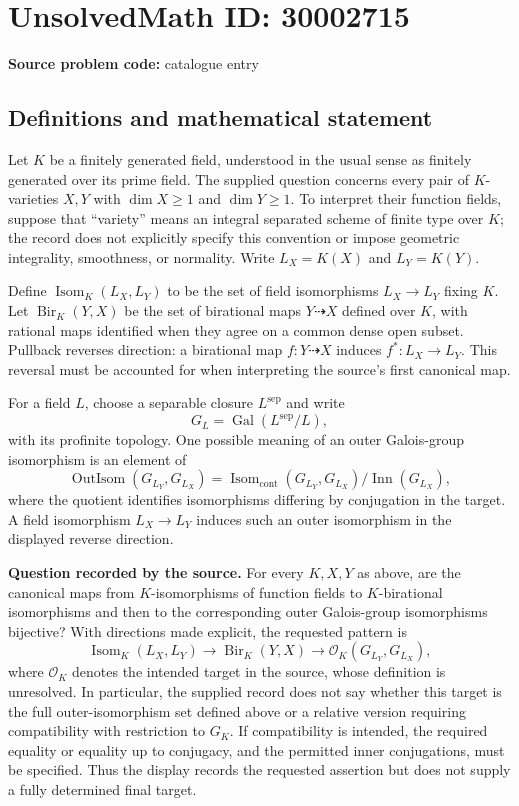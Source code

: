 \documentclass[11pt]{article}
\begin{document}
\section*{UnsolvedMath ID: 30002715}
\textbf{Source problem code:} catalogue entry
\subsection{Definitions and mathematical statement}
Let \(K\) be a finitely generated field, understood in the usual sense as finitely generated over its prime field. The supplied question concerns every pair of \(K\)-varieties \(X,Y\) with \(\dim X\geq 1\) and \(\dim Y\geq 1\). To interpret their function fields, suppose that ``variety'' means an integral separated scheme of finite type over \(K\); the record does not explicitly specify this convention or impose geometric integrality, smoothness, or normality. Write \(L_X=K(X)\) and \(L_Y=K(Y)\).

Define \(\operatorname{Isom}_K(L_X,L_Y)\) to be the set of field isomorphisms \(L_X\to L_Y\) fixing \(K\). Let \(\operatorname{Bir}_K(Y,X)\) be the set of birational maps \(Y\dashrightarrow X\) defined over \(K\), with rational maps identified when they agree on a common dense open subset. Pullback reverses direction: a birational map \(f:Y\dashrightarrow X\) induces \(f^*:L_X\to L_Y\). This reversal must be accounted for when interpreting the source's first canonical map.

For a field \(L\), choose a separable closure \(L^{\mathrm{sep}}\) and write
\[
G_L=\operatorname{Gal}(L^{\mathrm{sep}}/L),
\]
with its profinite topology. One possible meaning of an outer Galois-group isomorphism is an element of
\[
\operatorname{OutIsom}(G_{L_Y},G_{L_X})
=
\operatorname{Isom}_{\mathrm{cont}}(G_{L_Y},G_{L_X})
\big/\operatorname{Inn}(G_{L_X}),
\]
where the quotient identifies isomorphisms differing by conjugation in the target. A field isomorphism \(L_X\to L_Y\) induces such an outer isomorphism in the displayed reverse direction.

\textbf{Question recorded by the source.} For every \(K,X,Y\) as above, are the canonical maps from \(K\)-isomorphisms of function fields to \(K\)-birational isomorphisms and then to the corresponding outer Galois-group isomorphisms bijective? With directions made explicit, the requested pattern is
\[
\operatorname{Isom}_K(L_X,L_Y)
\longrightarrow
\operatorname{Bir}_K(Y,X)
\longrightarrow
\mathcal{O}_K(G_{L_Y},G_{L_X}),
\]
where \(\mathcal{O}_K\) denotes the intended target in the source, whose definition is unresolved. In particular, the supplied record does not say whether this target is the full outer-isomorphism set defined above or a relative version requiring compatibility with restriction to \(G_K\). If compatibility is intended, the required equality or equality up to conjugacy, and the permitted inner conjugations, must be specified. Thus the display records the requested assertion but does not supply a fully determined final target.
\end{document}
